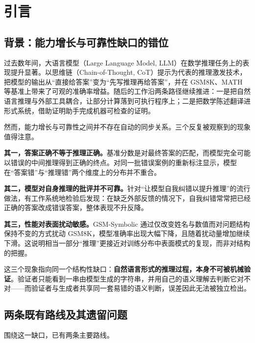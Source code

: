 \section{引言}

\subsection{背景：能力增长与可靠性缺口的错位}

过去数年间，大语言模型（Large Language Model, LLM）在数学推理任务上的表现提升显著。以思维链（Chain-of-Thought, CoT）提示为代表的推理激发技术\citep{wei2022chain,kojima2022large}，把模型的输出从“直接给答案”变为“先写推理再给答案”，并在 GSM8K\citep{cobbe2021training}、MATH\citep{hendrycks2021measuring} 等基准上带来了可观的准确率增益。随后的工作沿两条路径继续推进：一是把自然语言推理与外部工具耦合，让部分计算落到可执行程序上\citep{chen2022program,gao2022pal,schick2023toolformer}；二是把数学陈述翻译进形式系统，借助证明助手完成机器可检查的证明\citep{moura2021lean,mathlib2020lean,jiang2022draft,yang2023leandojo,xin2024deepseek}。

然而，能力增长与可靠性之间并不存在自动的同步关系。三个反复被观察到的现象值得注意。

\textbf{其一，答案正确不等于推理正确。}基准分数是对最终答案的匹配，而模型完全可能以错误的中间推理得到正确的终点。对同一批错误案例的重新标注显示，模型在“答案错”与“推理错”两个维度上的分布并不重合。

\textbf{其二，模型对自身推理的批评并不可靠。}针对“让模型自我纠错以提升推理”的流行做法，有工作系统地检验后发现：在缺乏外部反馈的情况下，自我纠错常常把已经正确的答案改成错误答案，整体表现不升反降\citep{huang2023large}。

\textbf{其三，性能对表面扰动敏感。}GSM-Symbolic 通过仅改变姓名与数值而对问题结构保持不变的方式扰动 GSM8K，模型准确率出现大幅下降，且随着扰动量增加继续下滑\citep{mirzadeh2024gsm}。这说明相当一部分“推理”更接近对训练分布中表面模式的复现，而非对结构的把握。

这三个现象指向同一个结构性缺口：\textbf{自然语言形式的推理过程，本身不可被机械验证}。验证者只能看到一串由模型生成的字符串，并用自己的语义理解去判断它对不对——而验证者与生成者共享同一套易错的语义判断，误差因此无法被独立检出。

\subsection{两条既有路线及其遗留问题}

围绕这一缺口，已有两条主要路线。

